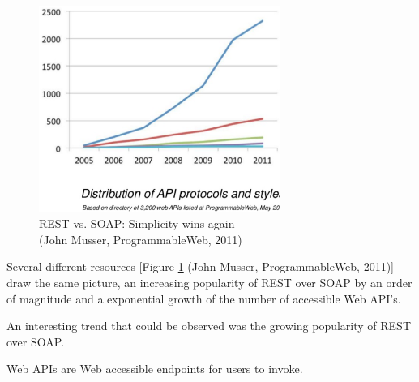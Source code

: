 \begin{figure}[!ht]
	\centering
  \includegraphics[width=0.7\textwidth]{figures/slide-11-1024}
  \caption{REST vs. SOAP: Simplicity wins again\\(John Musser, ProgrammableWeb, 2011)}
  \label{fig:slide-11-1024}
\end{figure}

Several different resources [Figure \ref{fig:slide-11-1024} (John Musser, ProgrammableWeb, 2011)] draw the same picture, an increasing popularity of REST over SOAP by an order of magnitude and a exponential growth of the number of accessible Web API's.

An interesting trend that could be observed was the growing popularity of REST over SOAP.~\cite{ploscar2012xml}




Web APIs are Web accessible endpoints for users to invoke.

